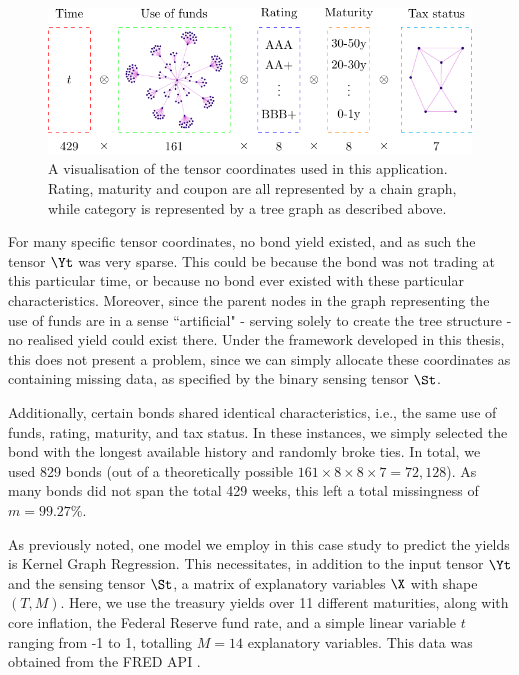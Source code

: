 \begin{figure}[t] 
    \begin{center}
        \includegraphics[width=0.9\linewidth]{Figures/bond_tensor.pdf}
    \end{center}
   \caption[A visualisation of the tensor coordinates used in the greed bond application]{A visualisation of the tensor coordinates used in this application. Rating, maturity and coupon are all represented by a chain graph, while category is represented by a tree graph as described above.} 
    \label{fig:bond_tensor}
\end{figure} 

For many specific tensor coordinates, no bond yield existed, and as such the tensor $\Yt$ was very sparse. This could be because the bond was not trading at this particular time, or because no bond ever existed with these particular characteristics. Moreover, since the parent nodes in the graph representing the use of funds are in a sense ``artificial" - serving solely to create the tree structure - no realised yield could exist there. Under the framework developed in this thesis, this does not present a problem, since we can simply allocate these coordinates as containing missing data, as specified by the binary sensing tensor $\St$. 

Additionally, certain bonds shared identical characteristics, i.e., the same use of funds, rating, maturity, and tax status. In these instances, we simply selected the bond with the longest available history and randomly broke ties. In total, we used 829 bonds (out of a theoretically possible $161 \times 8 \times 8 \times 7 = 72,128$). As many bonds did not span the total 429 weeks, this left a total missingness of $m=99.27\%$.

As previously noted, one model we employ in this case study to predict the yields is Kernel Graph Regression. This necessitates, in addition to the input tensor $\Yt$ and the sensing tensor $\St$, a matrix of explanatory variables $\X$ with shape $(T, M)$. Here, we use the treasury yields over 11 different maturities, along with core inflation, the Federal Reserve fund rate, and a simple linear variable $t$ ranging from -1 to 1, totalling $M=14$ explanatory variables. This data was obtained from the FRED API \citep{FRED2023}.


